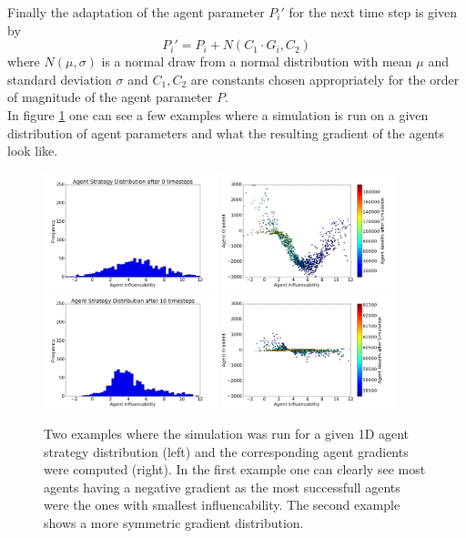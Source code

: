 \documentclass[11pt]{article}
\begin{document}
Finally the adaptation of the agent parameter $P_i'$ for the next time step is given by
\begin{equation}
  P_i' = P_i + N(C_1\cdot G_i, C_2)
\end{equation}
where $N(\mu, \sigma)$ is a normal draw from a normal distribution with mean $\mu$ and standard deviation $\sigma$ and $C_1,C_2$ are constants chosen appropriately for the order of magnitude of the agent parameter $P$. \\
In figure \ref{fig:heuristicgradient} one can see a few examples where a simulation is run on a given distribution of agent parameters and what the resulting gradient of the agents look like.
\begin{figure}
  \centering
  \quad
  \includegraphics[width=0.45\textwidth]{figures/heuristic_gradient_example_1.png}
  \includegraphics[width=0.45\textwidth]{figures/heuristic_gradient_example_2.png}
  \includegraphics[width=0.45\textwidth]{figures/heuristic_gradient_example_3.png}
  \includegraphics[width=0.45\textwidth]{figures/heuristic_gradient_example_4.png}
  \caption[Examples Heuristic Gradient]{Two examples where the simulation was run for a given 1D agent strategy distribution (left) and the corresponding agent gradients were computed (right). In the first example one can clearly see most agents having a negative gradient as the most successfull agents were the ones with smallest influencability. The second example shows a more symmetric gradient distribution.}
  \label{fig:heuristicgradient}
\end{figure}
\end{document}
